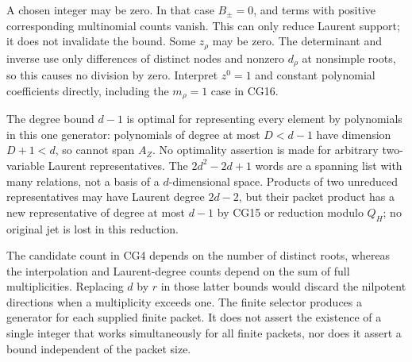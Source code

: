 A chosen integer may be zero. In that case $B_\pm=0$, and terms
with positive corresponding multinomial counts vanish. This can
only reduce Laurent support; it does not invalidate the bound.
Some $z_\rho$ may be zero. The determinant and inverse use only
differences of distinct nodes and nonzero $d_\rho$ at nonsimple
roots, so this
causes no division by zero. Interpret $z^0=1$ and constant
polynomial coefficients directly, including the $m_\rho=1$
case in CG16.

The degree bound $d-1$ is optimal for representing every element
by polynomials in this one generator: polynomials of degree at
most $D<d-1$ have dimension $D+1<d$, so cannot span $A_Z$.
No optimality assertion is made for arbitrary two-variable
Laurent representatives. The $2d^2-2d+1$ words are a spanning
list with many relations, not a basis of a $d$-dimensional
space. Products of two unreduced representatives may have
Laurent degree $2d-2$, but their packet product has a new
representative of degree at most $d-1$ by CG15 or reduction
modulo $Q_H$; no original jet is lost in this reduction.

The candidate count in CG4 depends on the number of distinct
roots, whereas the interpolation and Laurent-degree counts
depend on the sum of full multiplicities. Replacing $d$ by $r$
in those latter bounds would discard the nilpotent directions
when a multiplicity exceeds one.
The finite selector produces a generator for each supplied
finite packet. It does not assert the existence of a single
integer that works simultaneously for all finite packets, nor
does it assert a bound independent of the packet size.

